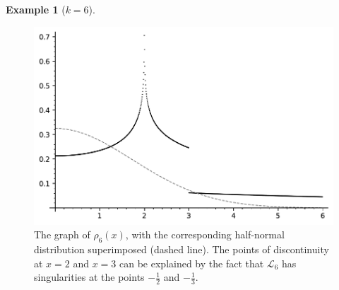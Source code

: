 \documentclass[12pt,reqno]{amsart}
\theoremstyle{definition}
\theoremstyle{plain}
\theoremstyle{definition}
\newtheorem{example}[theorem]{Example}
\begin{document}
\begin{example}[$k = 6$]
  \begin{figure}
    \centering
    \includegraphics[scale = 0.55]{p6.pdf}
    \caption{The graph of $\rho_6(x)$, with the corresponding half-normal distribution superimposed (dashed line). The points of discontinuity at $x= 2$ and $x = 3$ can be explained by the fact that $\mathcal{L}_6$ has singularities at the points $-\frac{1}{2}$ and $-\frac{1}{3}$.}
    \label{Fig:rho6}
  \end{figure}
\end{example}
\end{document}
